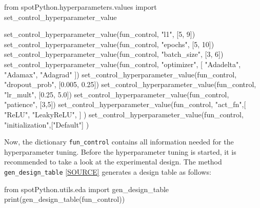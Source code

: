 \documentclass[
  letterpaper,
  DIV=11,
  numbers=noendperiod]{scrreprt}
\newenvironment{Shaded}{\begin{snugshade}}{\end{snugshade}}
\newcommand{\BuiltInTok}[1]{\textcolor[rgb]{0.00,0.23,0.31}{#1}}
\newcommand{\DecValTok}[1]{\textcolor[rgb]{0.68,0.00,0.00}{#1}}
\newcommand{\FloatTok}[1]{\textcolor[rgb]{0.68,0.00,0.00}{#1}}
\newcommand{\ImportTok}[1]{\textcolor[rgb]{0.00,0.46,0.62}{#1}}
\newcommand{\NormalTok}[1]{\textcolor[rgb]{0.00,0.23,0.31}{#1}}
\newcommand{\StringTok}[1]{\textcolor[rgb]{0.13,0.47,0.30}{#1}}
\begin{document}
\begin{Shaded}
\begin{Highlighting}[]
\ImportTok{from}\NormalTok{ spotPython.hyperparameters.values }\ImportTok{import}\NormalTok{ set\_control\_hyperparameter\_value}

\NormalTok{set\_control\_hyperparameter\_value(fun\_control, }\StringTok{"l1"}\NormalTok{, [}\DecValTok{5}\NormalTok{, }\DecValTok{9}\NormalTok{])}
\NormalTok{set\_control\_hyperparameter\_value(fun\_control, }\StringTok{"epochs"}\NormalTok{, [}\DecValTok{5}\NormalTok{, }\DecValTok{10}\NormalTok{])}
\NormalTok{set\_control\_hyperparameter\_value(fun\_control, }\StringTok{"batch\_size"}\NormalTok{, [}\DecValTok{3}\NormalTok{, }\DecValTok{6}\NormalTok{])}
\NormalTok{set\_control\_hyperparameter\_value(fun\_control, }\StringTok{"optimizer"}\NormalTok{, [}
                \StringTok{"Adadelta"}\NormalTok{,}
                \StringTok{"Adamax"}\NormalTok{,}
                \StringTok{"Adagrad"}
\NormalTok{            ])}
\NormalTok{set\_control\_hyperparameter\_value(fun\_control, }\StringTok{"dropout\_prob"}\NormalTok{, [}\FloatTok{0.005}\NormalTok{, }\FloatTok{0.25}\NormalTok{])}
\NormalTok{set\_control\_hyperparameter\_value(fun\_control, }\StringTok{"lr\_mult"}\NormalTok{, [}\FloatTok{0.25}\NormalTok{, }\FloatTok{5.0}\NormalTok{])}
\NormalTok{set\_control\_hyperparameter\_value(fun\_control, }\StringTok{"patience"}\NormalTok{, [}\DecValTok{3}\NormalTok{,}\DecValTok{5}\NormalTok{])}
\NormalTok{set\_control\_hyperparameter\_value(fun\_control, }\StringTok{"act\_fn"}\NormalTok{,[}
                \StringTok{"ReLU"}\NormalTok{,}
                \StringTok{"LeakyReLU"}\NormalTok{,}
\NormalTok{            ] )}
\NormalTok{set\_control\_hyperparameter\_value(fun\_control, }\StringTok{"initialization"}\NormalTok{,[}\StringTok{"Default"}\NormalTok{] )}
\end{Highlighting}
\end{Shaded}

Now, the dictionary \texttt{fun\_control} contains all information
needed for the hyperparameter tuning. Before the hyperparameter tuning
is started, it is recommended to take a look at the experimental design.
The method \texttt{gen\_design\_table}
\href{https://github.com/sequential-parameter-optimization/spotPython/blob/main/src/spotPython/utils/eda.py}{{[}SOURCE{]}}
generates a design table as follows:

\begin{Shaded}
\begin{Highlighting}[]
\ImportTok{from}\NormalTok{ spotPython.utils.eda }\ImportTok{import}\NormalTok{ gen\_design\_table}
\BuiltInTok{print}\NormalTok{(gen\_design\_table(fun\_control))}
\end{Highlighting}
\end{Shaded}
\end{document}
